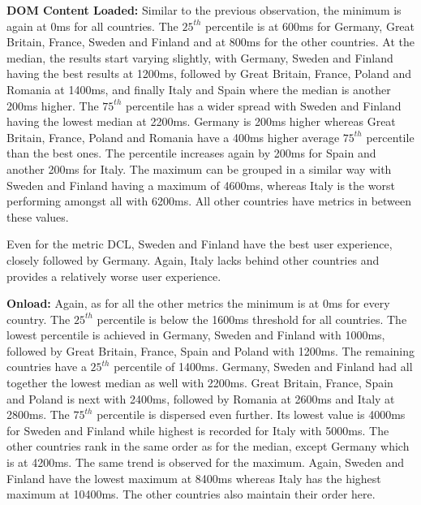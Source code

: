 \noindent\textbf{DOM Content Loaded:} Similar to the previous observation, the minimum is again at 0ms for all countries. The ${25}^{th}$ percentile is at 600ms for Germany, Great Britain, France, Sweden and Finland and at 800ms for the other countries. At the median, the results start varying slightly, with Germany, Sweden and Finland having the best results at 1200ms, followed by Great Britain, France, Poland and Romania at 1400ms, and finally Italy and Spain where the median is another 200ms higher. The ${75}^{th}$ percentile has a wider spread with Sweden and Finland having the lowest median at 2200ms. Germany is 200ms higher whereas Great Britain, France, Poland and Romania have a 400ms higher average ${75}^{th}$ percentile than the best ones. The percentile increases again by 200ms for Spain and another 200ms for Italy. The maximum can be grouped in a similar way with Sweden and Finland having a maximum of 4600ms, %
whereas Italy is the worst performing amongst all with 6200ms. All other countries have metrics in between these values.


Even for the metric DCL, Sweden and Finland have the best user experience, closely followed by Germany. %
Again, Italy lacks behind other countries and provides a relatively worse user experience.

\noindent\textbf{Onload:} Again, as for all the other metrics the minimum is at 0ms for every country. The ${25}^{th}$ percentile is below the 1600ms threshold for all countries. The lowest percentile is achieved in Germany, Sweden and Finland with 1000ms, followed by Great Britain, France, Spain and Poland with 1200ms. The remaining countries have a ${25}^{th}$ percentile of 1400ms. Germany, Sweden and Finland had all together the lowest median as well with 2200ms. Great Britain, France, Spain and Poland is next with 2400ms, followed by Romania at 2600ms and Italy at 2800ms. The ${75}^{th}$ percentile is dispersed even further. Its lowest value is 4000ms for Sweden and Finland while highest is recorded for Italy with 5000ms. The other countries rank in the same order as for the median, except Germany which is at 4200ms. The same trend is observed for the maximum. Again, Sweden and Finland have the lowest maximum at 8400ms whereas Italy has the highest maximum at 10400ms. The other countries also maintain their order here.

